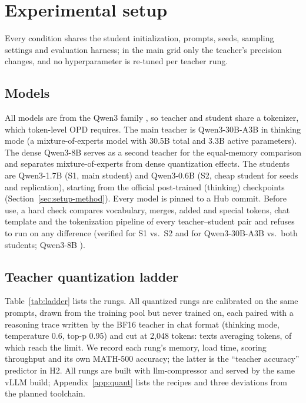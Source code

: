 \section{Experimental setup}\label{sec:setup}

Every condition shares the student initialization, prompts, seeds, sampling
settings and evaluation harness; in the main grid only the teacher's precision changes, and no
hyperparameter is re-tuned per teacher rung.

\subsection{Models}\label{sec:setup-models}
All models are from the Qwen3 family \citep{qwen3}, so teacher and student share a tokenizer,
which token-level OPD requires. The main teacher is Qwen3-30B-A3B in thinking mode (a
mixture-of-experts model with 30.5B total and 3.3B active parameters). The dense Qwen3-8B serves
as a second teacher for the equal-memory comparison and separates mixture-of-experts from dense
quantization effects. The students are Qwen3-1.7B (S1, main student) and Qwen3-0.6B (S2, cheap
student for seeds and replication), starting from the official post-trained (thinking)
checkpoints (Section~\ref{sec:setup-method}). Every model is pinned to a Hub
commit. Before use, a hard check compares vocabulary, merges, added and special tokens, chat
template and the tokenization pipeline of every teacher--student pair and refuses to run on any
difference (verified for S1 vs.\ S2 and for Qwen3-30B-A3B vs.\ both students; Qwen3-8B \TBD).

\subsection{Teacher quantization ladder}\label{sec:setup-ladder}
Table~\ref{tab:ladder} lists the rungs. All quantized rungs are calibrated on the same
\nCalib{} prompts, drawn from the training pool but never trained on, each paired with a
reasoning trace written by the BF16 teacher in chat format (thinking mode, temperature 0.6,
top-p 0.95) and cut at 2{,}048 tokens: \calibN{} texts averaging \calibMeanTok{} tokens, \calibAtLimit{}
of which reach the limit. We record
each rung's memory, load time, scoring throughput and its own MATH-500 accuracy; the latter is
the ``teacher accuracy'' predictor in H2. All rungs are built with llm-compressor and served by the same vLLM
build; Appendix~\ref{app:quant} lists the recipes and three deviations from the planned
toolchain.

